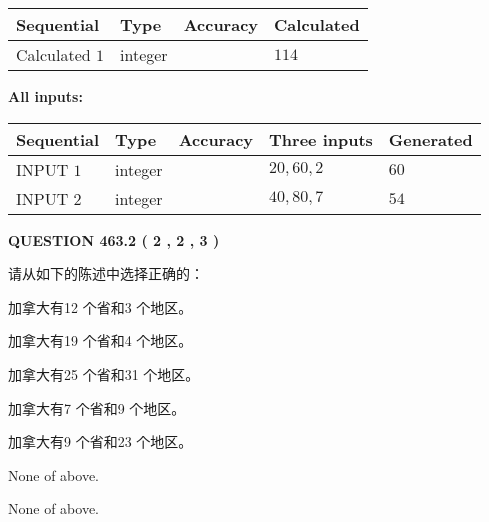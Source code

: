 \documentclass{ctexart}
\begin{document}
  
\noindent\begin{tabular}{|l|l|l|l|}
\hline
 Sequential & Type & Accuracy & Calculated \\ 
\hline
 
 
  Calculated $  1 $ & integer &  & 
  $ 114 $ 
 \\  \hline  
 \end{tabular}
   
   
   
   
\noindent\vspace{0.1in}\hspace{-0.08in} {\textbf{\Large{All inputs: }}}
   
   
  
  
\noindent\begin{tabular}{|l|l|l|l|l|}
\hline
 Sequential & Type & Accuracy & Three inputs & Generated \\ 
\hline
 
 
  INPUT $  1 $ & integer &  & $
 20
 , 
 60
 , 
 2
 $ & $ 60 $ 
 \\  \hline  
 
 
  INPUT $  2 $ & integer &  & $
 40
 , 
 80
 , 
 7
 $ & $ 54 $ 
 \\  \hline  
 \end{tabular}
   
   
  
\vspace{0.2in}
  
{\textbf{\Large{QUESTION
463.2 
 ( 2 , 2 , 3 )
}}}
  
  
请从如下的陈述中选择正确的：
 
 
加拿大有12 个省和3 个地区。
 
 
加拿大有19 个省和4 个地区。
 
 
加拿大有25 个省和31 个地区。
 
 
加拿大有7 个省和9 个地区。
 
 
加拿大有9 个省和23 个地区。
 
 
 None of above.
 
 
\noindent{}
 
 
 None of above.
 
 
\noindent{}
 
\end{document}
